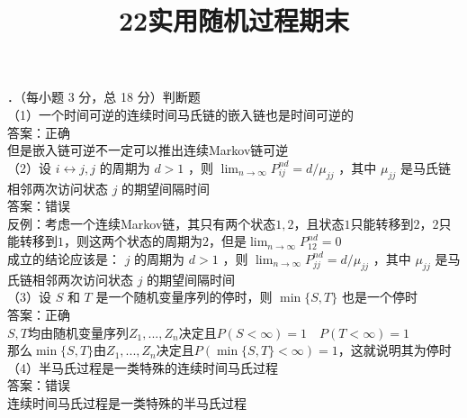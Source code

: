 \documentclass[UTF8]{ctexart}
\title{22实用随机过程期末}
\author{} %
\date{}
\begin{document}
\maketitle

．（每小题 3 分，总 18 分）判断题\\
（1）一个时间可逆的连续时间马氏链的嵌入链也是时间可逆的\\
答案：正确\\
但是嵌入链可逆不一定可以推出连续Markov链可逆\\


\noindent （2）设 $i \leftrightarrow j, j$ 的周期为 $d>1$ ，则 $\lim _{n \rightarrow \infty} P_{i j}^{n d}=d / \mu_{j j}$ ，其中 $\mu_{j j}$ 是马氏链相邻两次访问状态 $j$ 的期望间隔时间\\
答案：错误\\
反例：考虑一个连续Markov链，其只有两个状态${1,2}$，且状态$1$只能转移到$2$，$2$只能转移到$1$，则这两个状态的周期为$2$，但是$\lim_{n \rightarrow \infty}P_{12}^{n d}=0$\\
成立的结论应该是： $j$ 的周期为 $d>1$ ，则 $\lim _{n \rightarrow \infty} P_{j j}^{n d}=d / \mu_{j j}$ ，其中 $\mu_{j j}$ 是马氏链相邻两次访问状态 $j$ 的期望间隔时间\\


\noindent （3）设 $S$ 和 $T$ 是一个随机变量序列的停时，则 $\min \{S, T\}$ 也是一个停时\\
答案：正确\\
$S,T$均由随机变量序列$Z_1,...,Z_n$决定且$P(S<\infty)=1 \quad P(T<\infty)=1$\\
那么$\min \{S,T\}$由$Z_1,...,Z_n$决定且$P(\min \{S,T\}<\infty)=1$，这就说明其为停时\\


\noindent （4）半马氏过程是一类特殊的连续时间马氏过程\\
答案：错误\\
连续时间马氏过程是一类特殊的半马氏过程\\
\end{document}
